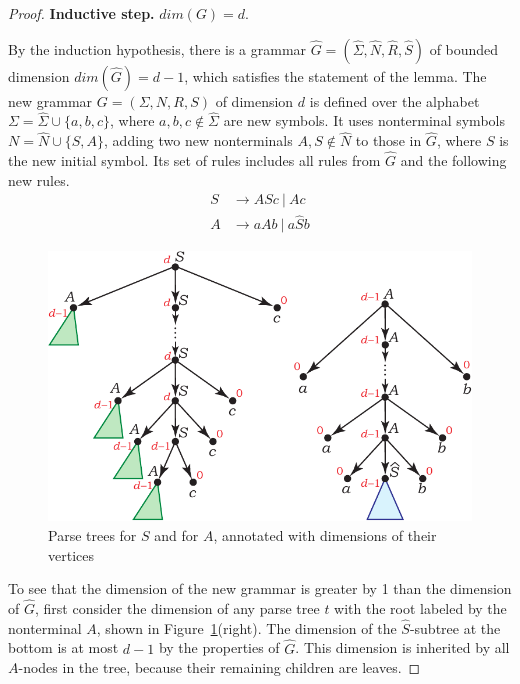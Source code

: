 \documentclass[runningheads]{llncs}
\begin{document}
\begin{proof}
\textbf{Inductive step.} $dim(G) = d$.

By the induction hypothesis,
there is a grammar $\widehat{G} = (\widehat{\Sigma}, \widehat{N}, \widehat{R}, \widehat{S})$
of bounded dimension $dim(\widehat{G}) = d-1$,
which satisfies the statement of the lemma.
The new grammar $G = (\Sigma, N, R, S)$ of dimension $d$
is defined over the alphabet 
$\Sigma = \widehat{\Sigma} \cup \{a, b, c\}$,
where $a, b, c \not\in \widehat{\Sigma}$ are new symbols.
It uses nonterminal symbols
$N = \widehat{N} \cup \{S, A\}$,
adding two new nonterminals $A, S \not\in \widehat{N}$ to those in $\widehat{G}$,
where $S$ is the new initial symbol.
Its set of rules includes all rules from $\widehat{G}$
and the following new rules.
\begin{align*}
	S &\to A S c \ | \ A c \\
	A &\to a A b \ | \ a \widehat{S} b
\end{align*}

\begin{figure}[t]
\centering
\includegraphics[scale=0.9]{pictures/rational_index_parse_tree_S_A.pdf}
\caption{Parse trees for $S$ and for $A$, annotated with dimensions of their vertices}
\label{dimsubtree}
\end{figure}

To see that the dimension of the new grammar is greater by 1 than the dimension of $\widehat{G}$,
first consider the dimension of any parse tree $t$ with the root labeled by the nonterminal $A$,
shown in Figure~\ref{dimsubtree}(right).
The dimension of the $\widehat{S}$-subtree at the bottom
is at most $d-1$ by the properties of $\widehat{G}$.
This dimension is inherited by all $A$-nodes in the tree,
because their remaining children are leaves.


\end{proof}
\end{document}
